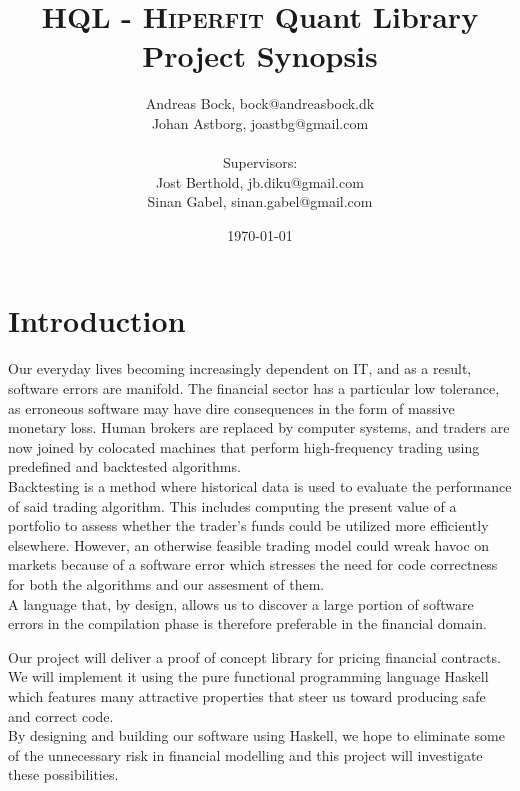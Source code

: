 \documentclass[11pt]{article}
\makeatletter
\def\Author{Andreas Bock, bock@andreasbock.dk\\
Johan Astborg, joastbg@gmail.com\\\\
Supervisors:\\
Jost Berthold, jb.diku@gmail.com\\
Sinan Gabel, sinan.gabel@gmail.com
}
\def\Title{\bf HQL - \textsc{Hiperfit} Quant Library\\ {\Large Project Synopsis}}
\makeatother
\begin{document}
\title{\Title}
\author{\Author}
\date{\today}
\maketitle

\begin{abstract}


\end{abstract}

\section*{Introduction}

Our everyday lives becoming increasingly dependent on IT, and as a result, software
errors are manifold. The financial sector has a particular low tolerance, as erroneous
software may have dire consequences in the form of massive monetary loss.
Human brokers are replaced by computer systems, and traders are now joined by
colocated machines that perform high-frequency trading using predefined and backtested algorithms.\\

Backtesting is a method where historical data is used to evaluate the performance of said
trading algorithm. This includes computing the present value of a portfolio to assess whether
the trader's funds could be utilized more efficiently elsewhere.
However, an otherwise feasible trading model could wreak havoc on markets because of a software error
which stresses the need for code correctness for both the algorithms and our assesment of them.\\

A language that, by design, allows us to discover a large portion of software errors in 
the compilation phase is therefore preferable in the financial domain. 

Our project will deliver a proof of concept library for pricing financial contracts.
We will implement it using the pure functional programming language Haskell which features
many attractive properties that steer us toward producing safe and correct code.\\

By designing and building our software using Haskell, we hope to eliminate some
of the unnecessary risk in financial modelling and this project will investigate these possibilities.\\
\end{document}
